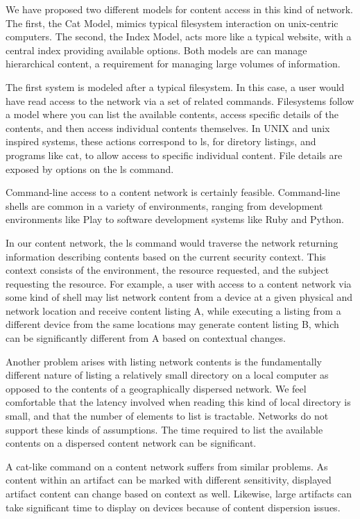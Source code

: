 We have proposed two different models for content access in this kind of network.  The first, the Cat Model, mimics typical filesystem interaction on unix-centric computers.  The second, the Index Model, acts more like a typical website, with a central index providing available options.  Both models are can manage hierarchical content, a requirement for managing large volumes of information.

The first system is modeled after a typical filesystem.  In this case, a user would have read access to the network via a set of related commands.  Filesystems follow a model where you can list the available contents, access specific details of the contents, and then access individual contents themselves.  In UNIX and unix inspired systems, these actions correspond to ls, for diretory listings, and programs like cat, to allow access to specific individual content.  File details are exposed by options on the ls command.

Command-line access to a content network is certainly feasible.  Command-line shells are common in a variety of environments, ranging from development environments like Play to software development systems like Ruby and Python.

In our content network, the ls command would traverse the network returning information describing contents based on the current security context.  This context consists of the environment, the resource requested, and the subject requesting the resource.  For example, a user with access to a content network via some kind of shell may list network content from a device at a given physical and network location and receive content listing A, while executing a listing from a different device from the same locations may generate content listing B, which can be significantly different from A based on contextual changes.

Another problem arises with listing network contents is the fundamentally different nature of listing a relatively small directory on a local computer as opposed to the contents of a geographically dispersed network.  We feel comfortable that the latency involved when reading this kind of local directory is small, and that the number of elements to list is tractable.  Networks do not support these kinds of assumptions.  The time required to list the available contents on a dispersed content network can be significant.

A cat-like command on a content network suffers from similar problems.  As content within an artifact can be marked with different sensitivity, displayed artifact content can change based on context as well.  Likewise, large artifacts can take significant time to display on devices because of content dispersion issues.

